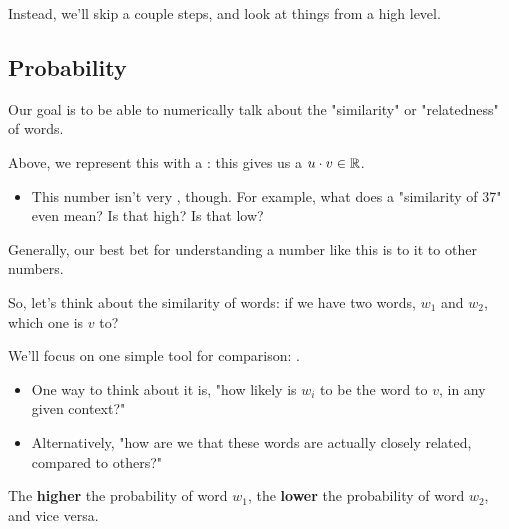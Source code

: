         Instead, we'll skip a couple steps, and look at things from a high level.

    \phantom{}

    \subsection{Probability}

        Our goal is to be able to numerically talk about the "similarity" or "relatedness" of words. 

        Above, we represent this with a : this gives us a  $u \cdot v \in \mathbb R$.
        
        \begin{itemize}

            \item This number isn't very , though. For example, what does a "similarity of 37" even mean? Is that high? Is that low?
        \end{itemize}

        \phantom{}

        Generally, our best bet for understanding a number like this is to  it to other numbers.

        So, let's think about the  similarity of words: if we have two words, $w_1$ and $w_2$, which one is $v$  to?

        We'll focus on one simple tool for comparison: . 

        \begin{itemize}
            \item One way to think about it is, "how likely is $w_i$ to be the  word to $v$, in any given context?"

            \item Alternatively, "how  are we that these words are actually closely related, compared to others?"
        \end{itemize}

        \phantom{}

        The \textbf{higher} the probability of word $w_1$, the \textbf{lower} the probability of word $w_2$, and vice versa.

